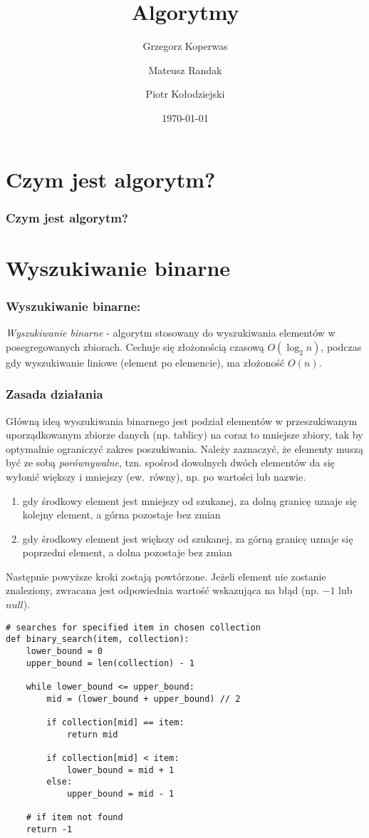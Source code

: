 \documentclass{beamer}
\title{Algorytmy}
\author{Grzegorz Koperwas \and Mateusz Randak \and Piotr Kołodziejski}
\date{\today}
\begin{document}
    \begin{frame}
        \titlepage
    \end{frame}
    \section{Czym jest algorytm?}
    \begin{frame}
        \frametitle{Czym jest algorytm?}
    \end{frame}
    \section{Wyszukiwanie binarne}
    \begin{frame}
        \frametitle{Wyszukiwanie binarne:}
        \emph{Wyszukiwanie binarne} - algorytm stosowany do wyszukiwania
        elementów w posegregowanych zbiorach. Cechuje się złożonością czasową $O \left(\log_2 n \right)$, podczas gdy wyszukiwanie liniowe (element po elemencie), ma złożoność $O \left( n \right)$.
    \end{frame}
    \begin{frame}
        \frametitle{Zasada działania}
        Główną ideą wyszukiwania binarnego jest podział elementów w przeszukiwanym uporządkowanym zbiorze danych
        (np. tablicy) na coraz to mniejsze zbiory, tak by optymalnie ograniczyć zakres poszukiwania.
        Należy zaznaczyć, że elementy muszą być ze sobą \emph{porównywalne}, tzn. spośrod dowolnych dwóch elementów
        da się wyłonić większy i mniejszy (ew.~równy), np. po wartości lub nazwie.

        \begin{enumerate}
            \item gdy środkowy element jest mniejszy od szukanej, za dolną granicę uznaje się kolejny element, a górna pozostaje bez zmian
            \item gdy środkowy element jest większy od szukanej, za górną granicę uznaje się poprzedni element,
            a dolna pozostaje bez zmian
        \end{enumerate}

        Następnie powyższe kroki zostają powtórzone. Jeżeli element nie zostanie znaleziony,
        zwracana jest odpowiednia wartość wskazująca na błąd (np. $-1$ lub $null$).
    \end{frame}
        \begin{verbatim}
# searches for specified item in chosen collection
def binary_search(item, collection):
    lower_bound = 0
    upper_bound = len(collection) - 1

    while lower_bound <= upper_bound:
        mid = (lower_bound + upper_bound) // 2

        if collection[mid] == item:
            return mid

        if collection[mid] < item:
            lower_bound = mid + 1
        else:
            upper_bound = mid - 1

    # if item not found
    return -1
        \end{verbatim}
\end{document}
